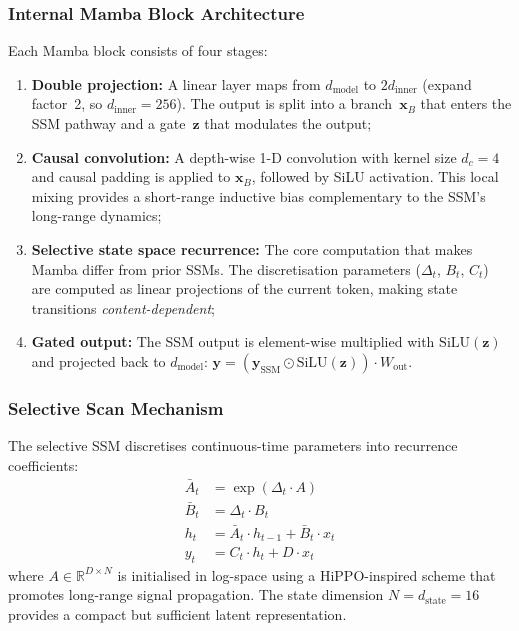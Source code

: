 \documentclass[conference]{IEEEtran}
\newcommand{\Real}{\mathbb{R}}
\begin{document}
\subsubsection{Internal Mamba Block Architecture}

Each Mamba block consists of four stages:
\begin{enumerate}[nosep]
    \item \textbf{Double projection:} A linear layer maps from
          $d_{\text{model}}$ to $2d_{\text{inner}}$ (expand
          factor~2, so $d_{\text{inner}} = 256$).  The output is
          split into a branch~$\mathbf{x}_B$ that enters the SSM
          pathway and a gate~$\mathbf{z}$ that modulates the output;
    \item \textbf{Causal convolution:} A depth-wise 1-D convolution
          with kernel size $d_c = 4$ and causal padding is applied
          to $\mathbf{x}_B$, followed by SiLU activation.  This
          local mixing provides a short-range inductive bias
          complementary to the SSM's long-range dynamics;
    \item \textbf{Selective state space recurrence:} The core
          computation that makes Mamba differ from prior SSMs.
          The discretisation parameters ($\Delta_t$, $B_t$, $C_t$)
          are computed as linear projections of the current token,
          making state transitions \emph{content-dependent};
    \item \textbf{Gated output:} The SSM output is element-wise
          multiplied with $\mathrm{SiLU}(\mathbf{z})$ and projected
          back to $d_{\text{model}}$:
          $\mathbf{y} = (\mathbf{y}_{\text{SSM}} \odot
          \mathrm{SiLU}(\mathbf{z})) \cdot W_{\text{out}}$.
\end{enumerate}

\subsubsection{Selective Scan Mechanism}

The selective SSM discretises continuous-time parameters into
recurrence coefficients:
\begin{align}
    \bar{A}_t &= \exp(\Delta_t \cdot A) \label{eq:disc_a} \\
    \bar{B}_t &= \Delta_t \cdot B_t \label{eq:disc_b} \\
    h_t &= \bar{A}_t \cdot h_{t-1} + \bar{B}_t \cdot x_t
    \label{eq:ssm_recurrence} \\
    y_t &= C_t \cdot h_t + D \cdot x_t \label{eq:ssm_output}
\end{align}
where $A \in \Real^{D \times N}$ is initialised in log-space
using a HiPPO-inspired scheme that promotes long-range signal
propagation.  The state dimension $N = d_{\text{state}} = 16$
provides a compact but sufficient latent representation.
\end{document}
